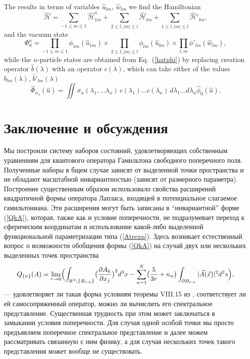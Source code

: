 \documentclass[12pt]{article}
\newcommand{\HH}{\mathscr{H}}
\newcommand{\RR}{\mathbb{R}}
\begin{document}
	The results in terms of variables
$ \hat{u}_{lm} $,
$ \hat{w}_{lm} $
	we find the Hamiltonian
\begin{equation*}
    \hat{\HH} = \sum_{-1\leq m\leq 1} \hat{\HH}_{1m}^{\kappa}
	+ \sum_{2\leq l, |m|\leq l} \hat{\HH}_{lm}
	+ \sum_{1\leq l, |m|\leq l} \hat{\HH}'_{lm} ,
\end{equation*}
	and the vacuum state
\begin{equation*}
    \Phi_{0}^{\kappa} = \prod_{-1\leq m \leq 1} \phi_{1m}(\hat{u}_{1m}) \times
    \prod_{2\leq l, |m|\leq l} \phi_{lm}(\hat{u}_{lm}) \times
	\prod_{l,m} \phi'_{lm}(\hat{w}_{lm}) ,
\end{equation*}
	while the
$ n $-particle states are obtained from
Eq.~(\ref{hatphi})
	by replacing creation operator
$ \hat{b}(\lambda) $ with an operator
$ c(\lambda) $,
	which can take either of the values
$ \hat{b}_{lm}(\lambda) $, $ \hat{b}'_{lm}(\lambda) $
\begin{equation*}
    \hat{\Phi}_{\sigma_{n}}(\hat{u}) = \iint
    \sigma_{n} (\lambda_{1},\ldots \lambda_{n}) \,
	c(\lambda_{1}) \ldots c(\lambda_{n}) \,
    d\lambda_{1} \ldots d\lambda_{n} \hat{\phi}_{0}(\hat{u}) .
\end{equation*}

\section{Заключение и обсуждения}
    Мы построили систему наборов состояний, удовлетворяющих собственным
    уравнениям для квантового оператора Гамильтона свободного поперечного
    поля.
    Полученные наборы в бщем случае
    зависят от выделенной точки пространства и не обладают
    масштабной инвариантностью (зависят от размерного параметра).
    Построение существенным образом использовало свойства расширений
    квадратичной формы оператора Лапласа, входящей в потенциальное слагаемое
    гамильтониана.
    Эти расширения могут быть записаны в ``инвариантной'' форме
(\ref{QkA}),
    которая, также как и условие поперечности, не подразумевает переход
    к сферическим координатам и использование какой-либо выделенной
    функциональной параметризации типа
(\ref{Atrexp}).
    Здесь возникает естественный вопрос о возможности обобщения формы
(\ref{QkA})
    на случай двух или нескольких выделенных точек пространства
\begin{equation*}
        Q_{\{\kappa\}}(A) = \lim_{r\to 0}\Bigl(
    \int_{\RR^{3}\setminus \{B_{r,n}\}}
        \bigl(\frac{\partial A_{k}}{\partial x_{j}}\bigr)^{2} d^{3} x -
    \sum_{n=1}^{N}\bigl(\frac{5}{3r}	+ \kappa_{n}\bigr)
	\int_{\partial B_{r,n}} |\vec{A}(\vec{x})|^{2} d^{2} s \Bigr) ,
\end{equation*}
    --- удовлетворяет ли такая форма условиям теоремы VIII.15 из
\cite{RS1},
    соответствует ли ей самосопряженный оператор, можно ли вычислить его
    спектральное представление. Существенная трудность при этом
    может заключаться в замыкании условия поперечности.
    Для случая одной особой точки мы просто предъявляем поперечное спектральное
    представление и далее можем рассматривать связанную с ним физику,
    а для случая нескольких точек такого представления может вообще
    не существовать.
\end{document}
